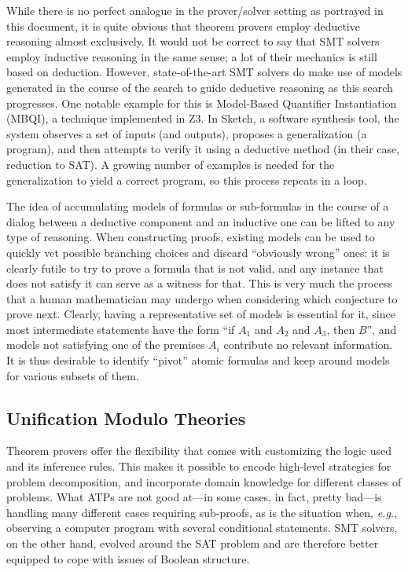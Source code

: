 While there is no perfect analogue in the prover/solver setting as portrayed
in this document, it is quite obvious that theorem provers employ deductive
reasoning almost exclusively.
It would not be correct to say that SMT solvers employ inductive reasoning in
the same sense; a lot of their mechanics is still based on deduction.
However, state-of-the-art SMT solvers do make use of models generated in the
course of the search to guide deductive reasoning as this search progresses.
One notable example for this is Model-Based Quantifier Instantiation (MBQI),
a technique implemented in Z3.
In Sketch, a software synthesis tool, the system observes a set of inputs (and
outputs), proposes a generalization (a program), and then attempts to verify it
using a deductive method (in their case, reduction to SAT).
A growing number of examples is needed for the generalization to yield a correct
program, so this process repeats in a loop.

The idea of accumulating models of formulas or sub-formulas in the course of
a dialog between a deductive component and an inductive one can be lifted to
any type of reasoning.
When constructing proofs, existing models can be used to quickly vet possible
branching choices and discard ``obviously wrong'' ones: it is clearly futile
to try to prove a formula that is not valid, and any instance that does not
satisfy it can serve as a witness for that.
This is very much the process that a human mathematician may undergo when
considering which conjecture to prove next.
Clearly, having a representative set of models is essential for it, since
most intermediate statements have the form ``if $A_1$ and $A_2$ and $A_3$, then
$B$'', and models not satisfying one of the premises $A_i$ contribute no
relevant information.
It is thus desirable to identify ``pivot'' atomic formulas and keep around
models for various subsets of them.


\subsection{Unification Modulo Theories}

Theorem provers offer the flexibility that comes with customizing the logic used and its inference rules.
This makes it possible to encode high-level strategies for problem decomposition, and incorporate domain knowledge for different classes of problems.
What ATPs are not good at---in some cases, in fact, pretty bad---is
handling many different cases requiring sub-proofs,
as is the situation when, \emph{e.g.}, observing a computer program with several conditional statements.
SMT solvers, on the other hand, evolved around the SAT problem and are therefore better equipped to cope with issues of Boolean structure.

